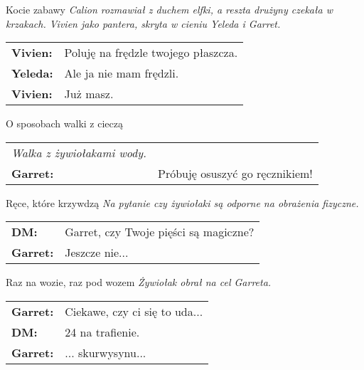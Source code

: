 \documentclass[10pt,twoside,twocolumn]{book}
\begin{document}
\begin{rpg-quotebox}{Kocie zabawy}
   \textit{Calion rozmawiał z duchem elfki, a reszta drużyny czekała w krzakach. Vivien jako pantera, skryta w cieniu Yeleda i Garret.}\\

   \begin{tabularx}{\columnwidth}{lX}
      \textbf{Vivien:} & Poluję na frędzle twojego płaszcza.\\
      \textbf{Yeleda:} & Ale ja nie mam frędzli.\\
      \textbf{Vivien:} & Już masz.\\
   \end{tabularx}
\end{rpg-quotebox}

\begin{rpg-quotebox}{O sposobach walki z cieczą}
   \begin{tabularx}{\columnwidth}{lX}
	   \textit{Walka z żywiołakami wody.}\\
	   \textbf{Garret:} & Próbuję osuszyć go ręcznikiem!\\
   \end{tabularx}
\end{rpg-quotebox}

\begin{rpg-quotebox}{Ręce, które krzywdzą}
   \textit{Na pytanie czy żywiołaki są odporne na obrażenia fizyczne.}\\
   
   \begin{tabularx}{\columnwidth}{lX}
	   \textbf{DM:} & Garret, czy Twoje pięści są magiczne?\\
	   \textbf{Garret:} & Jeszcze nie...\\
   \end{tabularx}
\end{rpg-quotebox}

\begin{rpg-quotebox}{Raz na wozie, raz pod wozem}
   \textit{Żywiołak obrał na cel Garreta.}\\
   
   \begin{tabularx}{\columnwidth}{lX}
      \textbf{Garret:} & Ciekawe, czy ci się to uda...\\
      \textbf{DM:} & 24 na trafienie.\\
      \textbf{Garret:} &... skurwysynu...\\
   \end{tabularx}
\end{rpg-quotebox}
\end{document}
